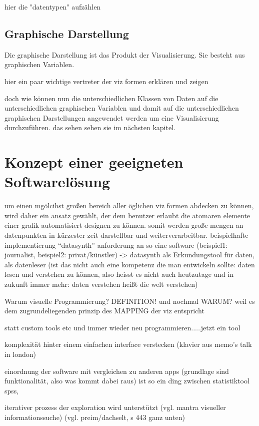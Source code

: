 \documentclass[a4paper, 12pt, DIVcalc, onepage, pdftex, headsepline, footsepline]{scrreprt}
\begin{document}
hier die "datentypen" aufzählen

\section{Graphische Darstellung}
\label{sec:Darstellungen}
Die graphische Darstellung ist das Produkt der Visualisierung. Sie besteht 
aus graphischen Variablen.

hier ein paar wichtige vertreter der viz formen erklären und zeigen

doch wie können nun die unterschiedlichen Klassen von Daten auf die unterschiedlichen graphischen Variablen und damit
auf die unterschiedlichen graphischen Darstellungen angewendet werden um eine Visualisierung durchzuführen. das sehen
sehen sie im nächsten kapitel.

\chapter{Konzept einer geeigneten Softwarelösung}
\label{cha:Software}
um einen mgölcihst großen bereich aller öglichen viz formen abdecken zu können, wird daher ein ansatz gewählt, der dem benutzer erlaubt die atomaren elemente einer grafik automatisiert designen zu können. somit werden große mengen an datenpunkten in kürzester zeit darstellbar und weiterverarbeitbar.
beispielhafte implementierung “datasynth”
anforderung an so eine software (beispiel1: journalist, beispiel2: privat/künstler)
-> datasynth als Erkundungstool für daten, als datenleser (ist das nicht auch eine kompetenz die man entwickeln sollte: daten lesen und verstehen zu können, also heisst es nicht auch heutzutage und in zukunft immer mehr: daten verstehen heißt die welt verstehen)

Warum visuelle Programmierung? DEFINITION! und nochmal WARUM?
weil es dem zugrundeliegenden prinzip des MAPPING der viz entspricht

statt custom tools etc und immer wieder neu programmieren.....jetzt ein tool

komplexität hinter einem einfachen interface verstecken (klavier aus memo’s talk in london)

einordnung der software mit vergleichen zu anderen apps (grundlage sind funktionalität, also was kommt dabei raus) ist so ein ding zwischen statistiktool spss, 

iterativer prozess der exploration wird unterstützt (vgl. mantra visueller informationssuche) (vgl. preim/dachselt, s 443 ganz unten)
\end{document}
